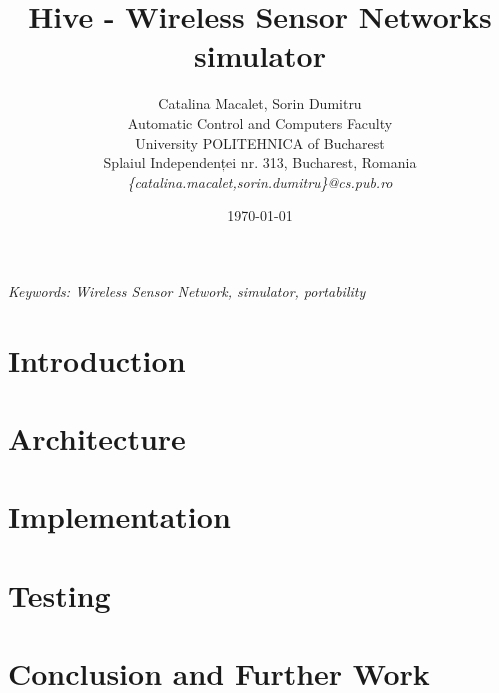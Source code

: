 \documentclass[12pt]{article}
\title{Hive - Wireless Sensor Networks simulator}
\author{Catalina Macalet, Sorin Dumitru\\
Automatic Control and Computers Faculty\\
University POLITEHNICA of Bucharest\\
Splaiul Independenței nr. 313, Bucharest, Romania \\
\emph{\{catalina.macalet,sorin.dumitru\}@cs.pub.ro}}
\date{\today}
\begin{document}
\maketitle

\begin{abstract}

\end{abstract}

\begin{center}
  \textit{Keywords: Wireless Sensor Network, simulator, portability}
  \end{center}

\section{Introduction}
\label{sec:introduction}


\section{Architecture}
\label{sec:architecture}


\section{Implementation}
\label{sec:implementation}


%

%

\section{Testing}
\label{sec:testing}


\section{Conclusion and Further Work}
\label{sec:conclusion}


\newpage



\end{document}
